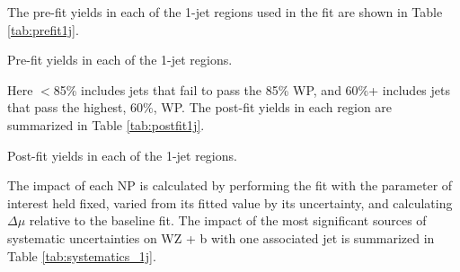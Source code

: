 


The pre-fit yields in each of the 1-jet regions used in the fit are shown in Table \ref{tab:prefit1j}.

\hspace{-1in}\begin{table}[H]
\begin{adjustwidth}{-3em}{-3em}
\small

\label{tab:prefit1j}
\caption{Pre-fit yields in each of the 1-jet regions.}
\end{adjustwidth}
\end{table}

Here $<$85\% includes jets that fail to pass the 85\% WP, and 60\%+ includes jets that pass the highest, 60\%, WP. The post-fit yields in each region are summarized in Table \ref{tab:postfit1j}.

\hspace{-1in}\begin{table}[H]
\begin{adjustwidth}{-3em}{-3em}
\small

\label{tab:postfit1j}
\caption{Post-fit yields in each of the 1-jet regions.}                                                                 
\end{adjustwidth} 
\end{table}

The impact of each NP is calculated by performing the fit with the parameter of interest held fixed, varied from its fitted value by its uncertainty, and calculating $\Delta\mu$ relative to the baseline fit.  The impact of the most significant sources of systematic uncertainties on WZ + b with one associated jet is summarized in Table \ref{tab:systematics_1j}. 

